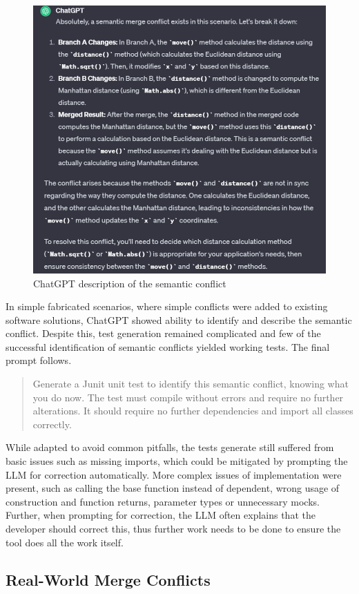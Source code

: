 \begin{figure}
    \centering
    \includegraphics[width=0.75\linewidth]{figures/image.png}
    \caption{ChatGPT description of the semantic conflict}
    \label{fig:semconf}
\end{figure}

In simple fabricated scenarios, where simple conflicts were added to existing software solutions, ChatGPT showed ability to identify and describe the semantic conflict. Despite this, test generation remained complicated and few of the successful identification of semantic conflicts yielded working tests. The final prompt follows.

\begin{quote}
Generate a Junit unit test to identify this semantic conflict, knowing what you do now. The test must compile without errors and require no further alterations. It should require no further dependencies and import all classes correctly.
\end{quote}

While adapted to avoid common pitfalls, the tests generate still suffered from basic issues such as missing imports, which could be mitigated by prompting the LLM for correction automatically. More complex issues of implementation were present, such as calling the base function instead of dependent, wrong usage of construction and function returns, parameter types or unnecessary mocks. Further, when prompting for correction, the LLM often explains that the developer should correct this, thus further work needs to be done to ensure the tool does all the work itself.

\subsection{Real-World Merge Conflicts}

